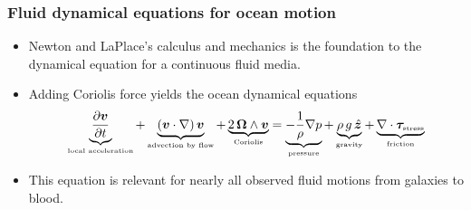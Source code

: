 \documentclass[10pt]{beamer}
\begin{document}
\begin{frame}
  \frametitle{Fluid dynamical equations for ocean motion}

\begin{center}
\vspace{-.25cm}
\hspace{1.5cm} 


\end{center}

\begin{exampleblock}{}
\begin{itemize}
\item Newton and LaPlace's calculus and mechanics is the foundation to
  the dynamical equation for a continuous fluid media.

\item Adding Coriolis force yields the ocean dynamical equations
\begin{equation}
  \underbrace{ \frac{\partial {\bm v}}{\partial t}}_{\mbox{\tiny local acceleration}}
  + 
  \underbrace{ ({\bm v} \cdot \nabla ) \, {\bm v} }_{\mbox{\tiny advection by flow}} 
 +
  \underbrace{ 2 \, {\bm \Omega} \wedge {\bm v} }_{\mbox{\tiny Coriolis}} 
= \underbrace{ -\frac{1}{\rho} \nabla p}_{\mbox{\tiny pressure}}
   + 
  \underbrace{ \rho \, g \, \hat{\bm z}}_{\mbox{\tiny gravity}}
 + 
  \underbrace{ \nabla \cdot {\bm \tau}_{\mbox{\tiny stress}}}_{\mbox{\tiny friction}}
\end{equation}

\item This equation is relevant for nearly all observed fluid motions
  from galaxies to blood.

\end{itemize}
\end{exampleblock}{}

\end{frame}
\end{document}
